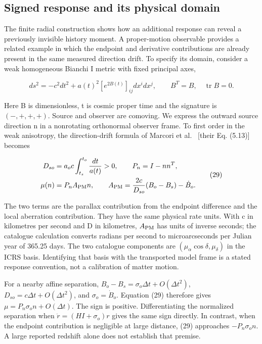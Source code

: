 \hypertarget{signed-response-and-its-physical-domain}{%
\subsection{Signed response and its physical domain}\label{signed-response-and-its-physical-domain}}

The finite radial construction shows how an additional response can reveal a previously invisible history moment. A proper-motion observable provides a related example in which the endpoint and derivative contributions are already present in the same measured direction drift. To specify its domain, consider a weak homogeneous Bianchi I metric with fixed principal axes,

\[
ds^2=-c^2dt^2+a(t)^2[e^{2B(t)}]_{ij}dx^i dx^j,
\qquad B^T=B,\quad \operatorname{tr}B=0.
\tag{28}
\]

Here B is dimensionless, t is cosmic proper time and the signature is \((- ,+,+,+)\). Source and observer are comoving. We express the outward source direction n in a nonrotating orthonormal observer frame. To first order in the weak anisotropy, the direction-drift formula of Marcori et al.~\cite{Marcori2018} {[}their Eq. (5.13){]} becomes

\[
\begin{aligned}
D_{so}&=a_o c\int_{t_s}^{t_o}\frac{dt}{a(t)}>0,\qquad
P_n=I-nn^T,\\
\mu(n)&=P_n A_{\rm PM}n,\qquad
A_{\rm PM}=\frac{2c}{D_{so}}(B_o-B_s)-\dot B_o.
\end{aligned}
\tag{29}
\]

The two terms are the parallax contribution from the endpoint difference and the local aberration contribution. They have the same physical rate units. With c in kilometres per second and D in kilometres, \(A_{\rm PM}\) has units of inverse seconds; the catalogue calculation converts radians per second to microarcseconds per Julian year of 365.25 days. The two catalogue components are \((\mu_\alpha\cos\delta,\mu_\delta)\) in the ICRS basis. Identifying that basis with the transported model frame is a stated response convention, not a calibration of matter motion.

For a nearby affine separation, \(B_o-B_s=\sigma_o\Delta t+O(\Delta t^2)\), \(D_{so}=c\Delta t+O(\Delta t^2)\), and \(\sigma_o=\dot B_o\). Equation (29) therefore gives \(\mu=P_n\sigma_o n+O(\Delta t)\). The sign is positive. Differentiating the normalized separation when \(\dot r=(H I+\sigma_o)r\) gives the same sign directly. In contrast, when the endpoint contribution is negligible at large distance, (29) approaches \(-P_n\sigma_o n\). A large reported redshift alone does not establish that premise.

